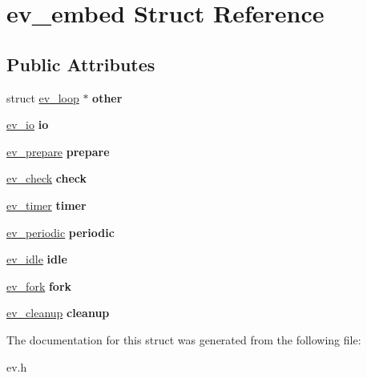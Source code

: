 \hypertarget{structev__embed}{}\section{ev\+\_\+embed Struct Reference}
\label{structev__embed}
\subsection*{Public Attributes}
\begin{DoxyCompactItemize}
\item 
\hypertarget{structev__embed_acb0b3a48271177125760d6b9914e71a7}{}\label{structev__embed_acb0b3a48271177125760d6b9914e71a7} 
struct \hyperlink{structev__loop}{ev\+\_\+loop} $\ast$ {\bfseries other}
\item 
\hypertarget{structev__embed_ab085dde44a1b194137db275caa1cfaa4}{}\label{structev__embed_ab085dde44a1b194137db275caa1cfaa4} 
\hyperlink{structev__io}{ev\+\_\+io} {\bfseries io}
\item 
\hypertarget{structev__embed_a779a812e0c15c15df660c210ee82fb62}{}\label{structev__embed_a779a812e0c15c15df660c210ee82fb62} 
\hyperlink{structev__prepare}{ev\+\_\+prepare} {\bfseries prepare}
\item 
\hypertarget{structev__embed_a96ff5f39de1b7d6c6ac914933063b2f8}{}\label{structev__embed_a96ff5f39de1b7d6c6ac914933063b2f8} 
\hyperlink{structev__check}{ev\+\_\+check} {\bfseries check}
\item 
\hypertarget{structev__embed_a52f8a6147c42ecfe547a44b1f391762d}{}\label{structev__embed_a52f8a6147c42ecfe547a44b1f391762d} 
\hyperlink{structev__timer}{ev\+\_\+timer} {\bfseries timer}
\item 
\hypertarget{structev__embed_aafa62ad98fab654b15c2128ea4b6b167}{}\label{structev__embed_aafa62ad98fab654b15c2128ea4b6b167} 
\hyperlink{structev__periodic}{ev\+\_\+periodic} {\bfseries periodic}
\item 
\hypertarget{structev__embed_a133d7aa3da26a48be70e26eb32aed3d7}{}\label{structev__embed_a133d7aa3da26a48be70e26eb32aed3d7} 
\hyperlink{structev__idle}{ev\+\_\+idle} {\bfseries idle}
\item 
\hypertarget{structev__embed_ad1d0209f5e2006e373028e8cb206c10b}{}\label{structev__embed_ad1d0209f5e2006e373028e8cb206c10b} 
\hyperlink{structev__fork}{ev\+\_\+fork} {\bfseries fork}
\item 
\hypertarget{structev__embed_ac072a5985c406408336aad8b1178ed13}{}\label{structev__embed_ac072a5985c406408336aad8b1178ed13} 
\hyperlink{structev__cleanup}{ev\+\_\+cleanup} {\bfseries cleanup}
\end{DoxyCompactItemize}


The documentation for this struct was generated from the following file\+:\begin{DoxyCompactItemize}
\item 
ev.\+h\end{DoxyCompactItemize}
